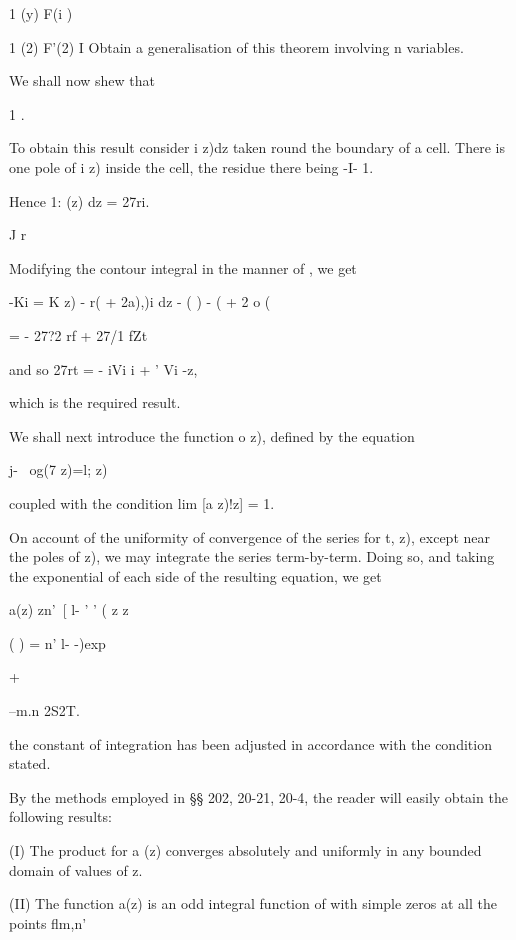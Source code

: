 {1 (y) F(i )

1 (2) F'(2) I Obtain a generalisation of this theorem involving n
variables.



We shall now shew that

1 .

To obtain this result consider i z)dz taken round the boundary of a
cell. There is one pole of i z) inside the cell, the residue there
being -I- 1.

Hence 1: (z) dz = 27ri.

J r

%
%

Modifying the contour integral in the manner of , we get

 -Ki = K z) - r( + 2a),)i dz - ( ) - ( + 2 o (

= - 27?2 rf + 27/1 fZt

and so 27rt = - iVi i + ' Vi -z,

which is the required result.


We shall next introduce the function o z), defined by the equation

j- \ og(7 z)=l; z)

coupled with the condition lim [a z)!z] = 1.

On account of the uniformity of convergence of the series for t, z),
except near the poles of z), we may integrate the series term-by-term.
Doing so, and taking the exponential of each side of the resulting
equation, we get

a(z) zn'\ [ l- ' ' ( z z

( ) = n' l- -)exp

+

--m.n 2S2T.

the constant of integration has been adjusted in accordance with the
condition stated.

By the methods employed in §§ 202, 20-21, 20-4, the reader will easily
obtain the following results:

(I) The product for a (z) converges absolutely and uniformly in any
bounded domain of values of z.

(II) The function a(z) is an odd integral function of with simple
zeros at all the points flm,n'

}
